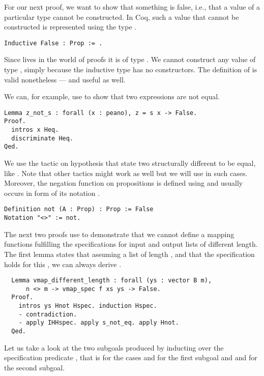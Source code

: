 For our next proof, we want to show that something is false, i.e., that a value of a particular type cannot be constructed.
In Coq, such a value that cannot be constructed is represented using the type .

\begin{verbatim}
Inductive False : Prop := .
\end{verbatim}

Since  lives in the world of proofs it is of type .
We cannot construct any value of type , simply because the inductive type has no constructors.
The definition of  is valid nonetheless --- and useful as well.

We can, for example, use  to show that two expressions are not equal.

\begin{verbatim}
Lemma z_not_s : forall (x : peano), z = s x -> False.
Proof.
  intros x Heq.
  discriminate Heq.
Qed.
\end{verbatim}

We use the tactic  on hypothesis that state two structurally different to be equal, like .
Note that other tactics might work as well but we will use  in such cases.
Moreover, the negation function on propositions  is defined using  and usually occurs in form of its notation \cinl{<>}.

\begin{verbatim}
Definition not (A : Prop) : Prop := False
Notation "<>" := not.
\end{verbatim}

The next two proofs use  to demonstrate that we cannot define a mapping functions fulfilling the specifications for input and output lists of different length.
The first lemma states that assuming a list  of length ,  and that the specification holds for this , we can always derive .

\begin{verbatim}
  Lemma vmap_different_length : forall (ys : vector B m),
      n <> m -> vmap_spec f xs ys -> False.
  Proof.
    intros ys Hnot Hspec. induction Hspec.
    - contradiction.
    - apply IHHspec. apply s_not_eq. apply Hnot.
  Qed.
\end{verbatim}

Let us take a look at the two subgoals produced by inducting over the specification predicate , that is for the cases  and   for the first subgoal and  and  for the second subgoal.


